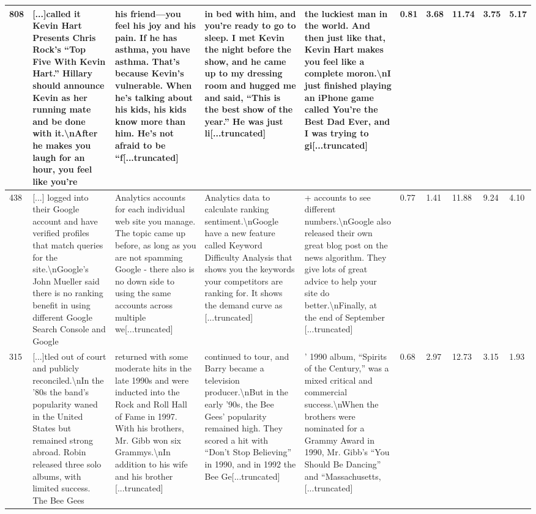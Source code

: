 \documentclass{article}
\theoremstyle{plain}
\theoremstyle{definition}
\theoremstyle{remark}
\begin{document}
\begin{table}[t]
\begin{tabular}{p{0.2cm}|p{2.75cm}|p{2.75cm}|p{2.75cm}|p{2.75cm}|p{0.2cm}|p{0.42cm}|p{0.42cm}|p{0.3cm}|p{0.3cm}}
 808 & [...]called it Kevin Hart Presents Chris Rock’s “Top Five With Kevin Hart.” Hillary should announce Kevin as her running mate and be done with it.\textbackslash nAfter he makes you laugh for an hour, you feel like you’re &   his friend—you feel his joy and his pain. If he has asthma, you have asthma. That’s because Kevin’s vulnerable. When he’s talking about his kids, his kids know more than him. He’s not afraid to be “f[...truncated] &    in bed with him, and you’re ready to go to sleep. I met Kevin the night before the show, and he came up to my dressing room and hugged me and said, “This is the best show of the year.” He was just li[...truncated] &     the luckiest man in the world. And then just like that, Kevin Hart makes you feel like a complete moron.\textbackslash nI just finished playing an iPhone game called You’re the Best Dad Ever, and I was trying to gi[...truncated] &               0.81 &           3.68 &         11.74 &       3.75 &      5.17 \\\midrule
 438 & [...] logged into their Google account and have verified profiles that match queries for the site.\textbackslash nGoogle's John Mueller said there is no ranking benefit in using different Google Search Console and Google &   Analytics accounts for each individual web site you manage. The topic came up before, as long as you are not spamming Google - there also is no down side to using the same accounts across multiple we[...truncated] &   Analytics data to calculate ranking sentiment.\textbackslash nGoogle have a new feature called Keyword Difficulty Analysis that shows you the keywords your competitors are ranking for. It shows the demand curve as [...truncated] &   + accounts to see different numbers.\textbackslash nGoogle also released their own great blog post on the news algorithm. They give lots of great advice to help your site do better.\textbackslash nFinally, at the end of September [...truncated] &               0.77 &           1.41 &         11.88 &       9.24 &      4.10 \\\midrule
 315 & [...]tled out of court and publicly reconciled.\textbackslash nIn the ’80s the band’s popularity waned in the United States but remained strong abroad. Robin released three solo albums, with limited success. The Bee Gees &  returned with some moderate hits in the late 1990s and were inducted into the Rock and Roll Hall of Fame in 1997. With his brothers, Mr. Gibb won six Grammys.\textbackslash nIn addition to his wife and his brother [...truncated] &   continued to tour, and Barry became a television producer.\textbackslash nBut in the early ’90s, the Bee Gees’ popularity remained high. They scored a hit with “Don’t Stop Believing” in 1990, and in 1992 the Bee Ge[...truncated] &    ’ 1990 album, “Spirits of the Century,” was a mixed critical and commercial success.\textbackslash nWhen the brothers were nominated for a Grammy Award in 1990, Mr. Gibb’s “You Should Be Dancing” and “Massachusetts,[...truncated] &               0.68 &           2.97 &         12.73 &       3.15 &      1.93 \\

\end{tabular}
\end{table}
\end{document}
